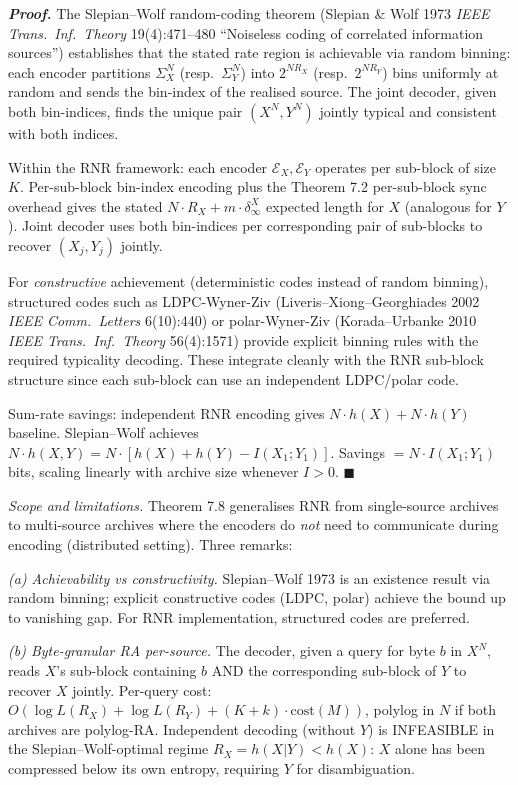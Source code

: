 \documentclass[
]{article}
\begin{document}
\emph{\textbf{Proof.}} The Slepian--Wolf random-coding theorem
(Slepian \& Wolf 1973 \emph{IEEE Trans.\ Inf.\ Theory} 19(4):471--480
``Noiseless coding of correlated information sources'') establishes
that the stated rate region is achievable via random binning: each
encoder partitions $\Sigma_X^N$ (resp.\ $\Sigma_Y^N$) into $2^{N R_X}$
(resp.\ $2^{N R_Y}$) bins uniformly at random and sends the
bin-index of the realised source. The joint decoder, given both
bin-indices, finds the unique pair $(X^N, Y^N)$ jointly typical and
consistent with both indices.

Within the RNR framework: each encoder $\mathcal{E}_X, \mathcal{E}_Y$
operates per sub-block of size $K$. Per-sub-block bin-index encoding
plus the Theorem 7.2 per-sub-block sync overhead gives the stated
$N \cdot R_X + m \cdot \delta_\infty^X$ expected length for $X$
(analogous for $Y$). Joint decoder uses both bin-indices per
corresponding pair of sub-blocks to recover $(X_j, Y_j)$ jointly.

For \emph{constructive} achievement (deterministic codes instead of
random binning), structured codes such as LDPC-Wyner-Ziv
(Liveris--Xiong--Georghiades 2002 \emph{IEEE Comm.\ Letters}
6(10):440) or polar-Wyner-Ziv (Korada--Urbanke 2010 \emph{IEEE Trans.\
Inf.\ Theory} 56(4):1571) provide explicit binning rules with the
required typicality decoding. These integrate cleanly with the
RNR sub-block structure since each sub-block can use an independent
LDPC/polar code.

Sum-rate savings: independent RNR encoding gives $N \cdot h(X) + N
\cdot h(Y)$ baseline. Slepian--Wolf achieves $N \cdot h(X, Y) =
N \cdot [h(X) + h(Y) - I(X_1; Y_1)]$. Savings $= N \cdot I(X_1; Y_1)$
bits, scaling linearly with archive size whenever $I > 0$.
\hfill$\blacksquare$

\emph{Scope and limitations.} Theorem 7.8 generalises RNR from
single-source archives to multi-source archives where the encoders
do \emph{not} need to communicate during encoding (distributed
setting). Three remarks:

\emph{(a) Achievability vs constructivity.} Slepian--Wolf 1973 is an
existence result via random binning; explicit constructive codes
(LDPC, polar) achieve the bound up to vanishing gap. For RNR
implementation, structured codes are preferred.

\emph{(b) Byte-granular RA per-source.} The decoder, given a query
for byte $b$ in $X^N$, reads $X$'s sub-block containing $b$ AND the
corresponding sub-block of $Y$ to recover $X$ jointly. Per-query
cost: $O(\log L(R_X) + \log L(R_Y) + (K + k) \cdot \mathrm{cost}(M))$,
polylog in $N$ if both archives are polylog-RA. Independent decoding
(without $Y$) is INFEASIBLE in the Slepian--Wolf-optimal regime
$R_X = h(X | Y) < h(X)$: $X$ alone has been compressed below its
own entropy, requiring $Y$ for disambiguation.
\end{document}
